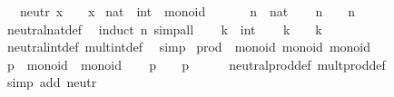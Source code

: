 \begin{isabellebody}
\ \ \ neutr{\isacharcolon}\ {\isachardoublequoteopen}x\ {\isasymotimes}\ {\isasymone}\ {\isacharequal}\ x{\isachardoublequoteclose}\isanewline
\isanewline
{}\isamarkupfalse%
\ nat\ \ int\ {\isacharcolon}{\isacharcolon}\ monoid\ \isanewline
{}\isanewline
\isanewline
{}\isamarkupfalse%
\ \isamarkupfalse%
\isanewline
\ \ \isamarkupfalse%
\ n\ {\isacharcolon}{\isacharcolon}\ nat\isanewline
\ \ \isamarkupfalse%
\ {\isachardoublequoteopen}n\ {\isasymotimes}\ {\isasymone}\ {\isacharequal}\ n{\isachardoublequoteclose}\isanewline
\ \ \ \ \isamarkupfalse%
\ neutral{\isacharunderscore}nat{\isacharunderscore}def\ \isamarkupfalse%
\ {\isacharparenleft}induct\ n{\isacharparenright}\ simp{\isacharunderscore}all\isanewline
{}\isamarkupfalse%
\isanewline
\ \ \isamarkupfalse%
\ k\ {\isacharcolon}{\isacharcolon}\ int\isanewline
\ \ \isamarkupfalse%
\ {\isachardoublequoteopen}k\ {\isasymotimes}\ {\isasymone}\ {\isacharequal}\ k{\isachardoublequoteclose}\isanewline
\ \ \ \ \isamarkupfalse%
\ neutral{\isacharunderscore}int{\isacharunderscore}def\ mult{\isacharunderscore}int{\isacharunderscore}def\ \isamarkupfalse%
\ simp\isanewline
{}\isamarkupfalse%
\isanewline
\isanewline
{}\isamarkupfalse%
\isanewline
\isanewline
{}\isamarkupfalse%
\ prod\ {\isacharcolon}{\isacharcolon}\ {\isacharparenleft}monoid{\isacharcomma}\ monoid{\isacharparenright}\ monoid\isanewline
{}\isanewline
\isanewline
{}\isamarkupfalse%
\ \isamarkupfalse%
\ \isanewline
\ \ \isamarkupfalse%
\ p\ {\isacharcolon}{\isacharcolon}\ {\isachardoublequoteopen}{\isasymalpha}{\isasymColon}monoid\ {\isasymtimes}\ {\isasymbeta}{\isasymColon}monoid{\isachardoublequoteclose}\isanewline
\ \ \isamarkupfalse%
\ {\isachardoublequoteopen}p\ {\isasymotimes}\ {\isasymone}\ {\isacharequal}\ p{\isachardoublequoteclose}\isanewline
\ \ \ \ \isamarkupfalse%
\ neutral{\isacharunderscore}prod{\isacharunderscore}def\ mult{\isacharunderscore}prod{\isacharunderscore}def\ \isamarkupfalse%
\ {\isacharparenleft}simp\ add{\isacharcolon}\ neutr{\isacharparenright}\isanewline
{}\isamarkupfalse%
\isanewline
\isanewline
{}\isamarkupfalse%
%
\endisatagquote
{\isafoldquote}%
%
\isadelimquote

\end{isabellebody}
